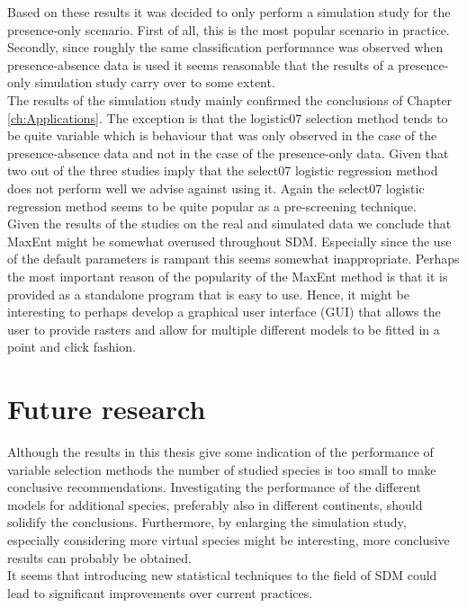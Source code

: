 Based on these results it was decided to only perform a simulation study for the presence-only scenario. First of all, this is the most popular scenario in practice. Secondly, since roughly the same classification performance was observed when presence-absence data is used it seems reasonable that the results of a presence-only simulation study carry over to some extent. \\

The results of the simulation study mainly confirmed the conclusions of Chapter \ref{ch:Applications}. The exception is that the logistic07 selection method tends to be quite variable which is behaviour that was only observed in the case of the presence-absence data and not in the case of the presence-only data. Given that two out of the three studies imply that the select07 logistic regression method does not perform well we advise against using it. Again the select07 logistic regression method seems to be quite popular as a pre-screening technique. \\

Given the results of the studies on the real and simulated data we conclude that MaxEnt might be somewhat overused throughout SDM. Especially since the use of the default parameters is rampant this seems somewhat inappropriate. Perhaps the most important reason of the popularity of the MaxEnt method is that it is provided as a standalone program that is easy to use. Hence, it might be interesting to perhaps develop a graphical user interface (GUI) that allows the user to provide rasters and allow for multiple different models to be fitted in a point and click fashion.

\section{Future research}
Although the results in this thesis give some indication of the performance of variable selection methods the number of studied species is too small to make conclusive recommendations. Investigating the performance of the different models for additional species, preferably also in different continents, should solidify the conclusions. Furthermore, by enlarging the simulation study, especially considering more virtual species might be interesting, more conclusive results can probably be obtained.\\

It seems that introducing new statistical techniques to the field of SDM could lead to significant improvements over current practices. \\

